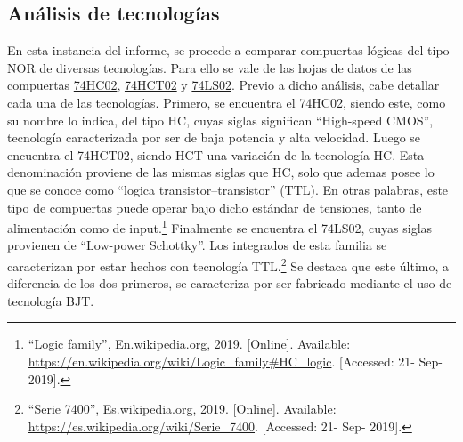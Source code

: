 



\subsection{Análisis de tecnologías}

En esta instancia del informe, se procede a comparar compuertas lógicas del tipo NOR de diversas tecnologías. Para ello se vale de las hojas de datos de las compuertas \href{http://www.ti.com/lit/ds/symlink/sn74hc02.pdf}{74HC02}, \href{http://www.ti.com/lit/ds/symlink/sn74hct02.pdf}{74HCT02} y \href{http://www.ti.com/lit/ds/symlink/sn74ls02.pdf}{74LS02}. Previo a dicho análisis, cabe detallar cada una de las tecnologías. Primero, se encuentra el 74HC02, siendo este, como su nombre lo indica, del tipo HC, cuyas siglas significan ``High-speed CMOS'', tecnología caracterizada por ser de baja potencia y alta velocidad. Luego se encuentra el 74HCT02, siendo HCT una variación de la tecnología HC. Esta denominación proviene de las mismas siglas que HC, solo que ademas posee lo que se conoce como ``logica transistor–transistor'' (TTL). En otras palabras, este tipo de compuertas puede operar bajo dicho estándar de tensiones, tanto de alimentación como de input.\footnote{``Logic family'', En.wikipedia.org, 2019. [Online]. Available: \url{https://en.wikipedia.org/wiki/Logic\_family\#HC\_logic}. [Accessed: 21- Sep- 2019].} Finalmente se encuentra el 74LS02, cuyas siglas provienen de ``Low-power Schottky''. Los integrados de esta familia se caracterizan por estar hechos con tecnología TTL.\footnote{``Serie 7400'', Es.wikipedia.org, 2019. [Online]. Available: \url{https://es.wikipedia.org/wiki/Serie\_7400}. [Accessed: 21- Sep- 2019].} Se destaca que este último, a diferencia de los dos primeros, se caracteriza por ser fabricado mediante el uso de tecnología BJT.

